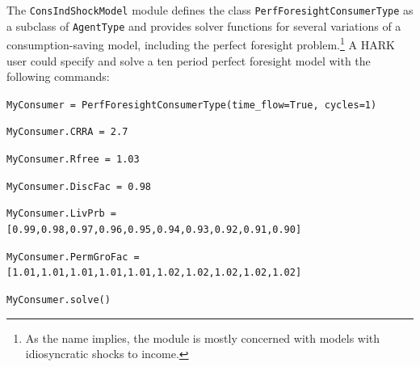 \documentclass[12pt,titlepage,letterpaper]{econtex}
\begin{document}
The \texttt{ConsIndShockModel} module defines the class \texttt{PerfForesightConsumerType} as a subclass of \texttt{AgentType} and provides solver functions for several variations of a consumption-saving model, including the perfect foresight problem.\footnote{As the name implies, the module is mostly concerned with models with idiosyncratic shocks to income.}  A HARK user could specify and solve a ten period perfect foresight model with the following commands:

\vspace{0.25cm}

\noindent \texttt{MyConsumer = PerfForesightConsumerType(time\_flow=True, cycles=1)}

\noindent \texttt{MyConsumer.CRRA = 2.7}

\noindent \texttt{MyConsumer.Rfree = 1.03}

\noindent \texttt{MyConsumer.DiscFac = 0.98}

\noindent \texttt{MyConsumer.LivPrb = [0.99,0.98,0.97,0.96,0.95,0.94,0.93,0.92,0.91,0.90]}

\noindent \texttt{MyConsumer.PermGroFac = [1.01,1.01,1.01,1.01,1.01,1.02,1.02,1.02,1.02,1.02]}

\noindent \texttt{MyConsumer.solve()}

\vspace{0.25cm}
\end{document}
